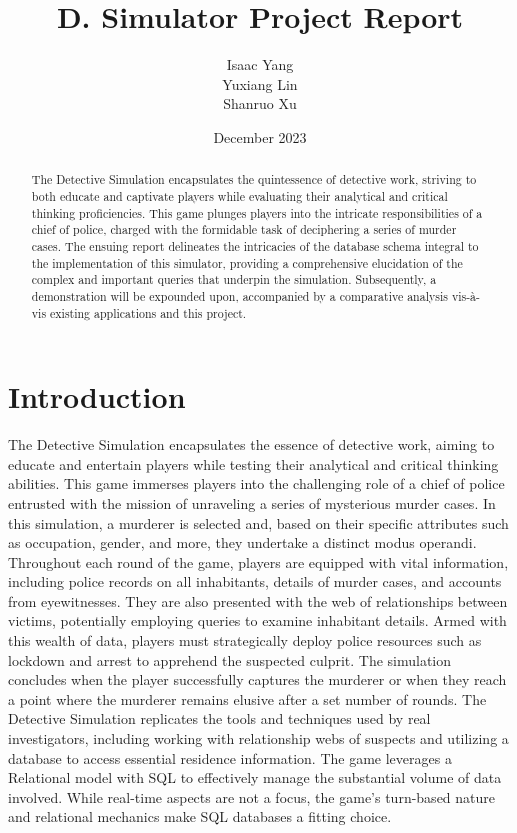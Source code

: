 \documentclass{article}
\title{D. Simulator Project Report}
\author{Isaac Yang \\Yuxiang Lin\\Shanruo Xu}
\date{December 2023}
\begin{document}
\maketitle

\begin{abstract}
The Detective Simulation encapsulates the quintessence of detective work, striving to both educate and captivate players while evaluating their analytical and critical thinking proficiencies. This game plunges players into the intricate responsibilities of a chief of police, charged with the formidable task of deciphering a series of murder cases. The ensuing report delineates the intricacies of the database schema integral to the implementation of this simulator, providing a comprehensive elucidation of the complex and important queries that underpin the simulation. Subsequently, a demonstration will be expounded upon, accompanied by a comparative analysis vis-à-vis existing applications and this project.
\end{abstract}

\section{Introduction}
 The Detective Simulation encapsulates the essence of detective work, aiming to educate and entertain players while testing their analytical and critical thinking abilities. This game immerses players into the challenging role of a chief of police entrusted with the mission of unraveling a series of mysterious murder cases. In this simulation, a murderer is selected and, based on their specific attributes such as occupation, gender, and more, they undertake a distinct modus operandi. Throughout each round of the game, players are equipped with vital information, including police records on all inhabitants, details of murder cases, and accounts from eyewitnesses. They are also presented with the web of relationships between victims, potentially employing queries to examine inhabitant details. Armed with this wealth of data, players must strategically deploy police resources such as lockdown and arrest to apprehend the suspected culprit. The simulation concludes when the player successfully captures the murderer or when they reach a point where the murderer remains elusive after a set number of rounds. The Detective Simulation replicates the tools and techniques used by real investigators, including working with relationship webs of suspects and utilizing a database to access essential residence information. The game leverages a Relational model with SQL to effectively manage the substantial volume of data involved. While real-time aspects are not a focus, the game's turn-based nature and relational mechanics make SQL databases a fitting choice.
 
\end{document}
